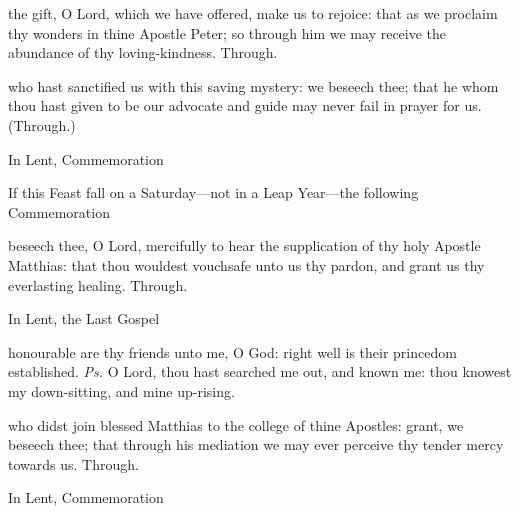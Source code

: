 
\postcommunion
{} the gift, O Lord, which we have offered, make us to rejoice: that as we proclaim thy wonders in thine Apostle Peter; so through him we may receive the abundance of thy loving-kindness. Through.

 who hast sanctified us with this saving mystery: we beseech thee; that he whom thou hast given to be our advocate and guide may never fail in prayer for us. (Through.)
\begin{rubric}
    In Lent, Commemoration %
\end{rubric}
\begin{rubric}
    If this Feast fall on a Saturday---not in a Leap Year---the following Commemoration 
\end{rubric}

 beseech thee, O Lord, mercifully to hear the supplication of thy holy Apostle Matthias: that thou wouldest vouchsafe unto us thy pardon, and grant us thy everlasting healing. Through.
\begin{rubric}
    In Lent, the Last Gospel 
\end{rubric}


\clearpage
{}

\introit
{} honourable are thy friends unto me, O God: right well is their princedom established. \textit{Ps.} O Lord, thou hast searched me out, and known me: thou knowest my down-sitting, and mine up-rising.

\collect
 who didst join blessed Matthias to the college of thine Apostles: grant, we beseech thee; that through his mediation we may ever perceive thy tender mercy towards us. Through.
\begin{rubric}
    In Lent, Commemoration %
\end{rubric}

